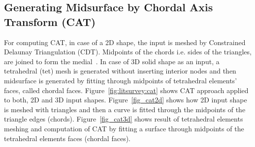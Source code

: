 

\subsection{Generating Midsurface by Chordal  Axis Transform (CAT)}	


For computing CAT, in case of a 2D shape, the input is meshed by Constrained Delaunay Triangulation (CDT). Midpoints of the chords i.e. sides of the triangles, are joined to form the medial~\cite{QuadrosRoshanOwenBrewerShimada2004}. In case of 3D solid shape as an input, a tetrahedral (tet) mesh is generated without inserting interior nodes and then midsurface is generated by fitting through midpoints of tetrahedral elements' faces, called chordal faces. Figure~\ref{fig:litsurvey:cat} shows CAT approach applied to both, 2D and 3D input shapes. Figure~\ref{fig_cat2d} shows how 2D input  shape is meshed with triangles and then a curve is fitted through the midpoints of the triangle edges (chords). Figure~\ref{fig_cat3d} shows result of tetrahedral elements meshing and computation of CAT by fitting a surface through midpoints of the tetrahedral elements faces (chordal faces).


